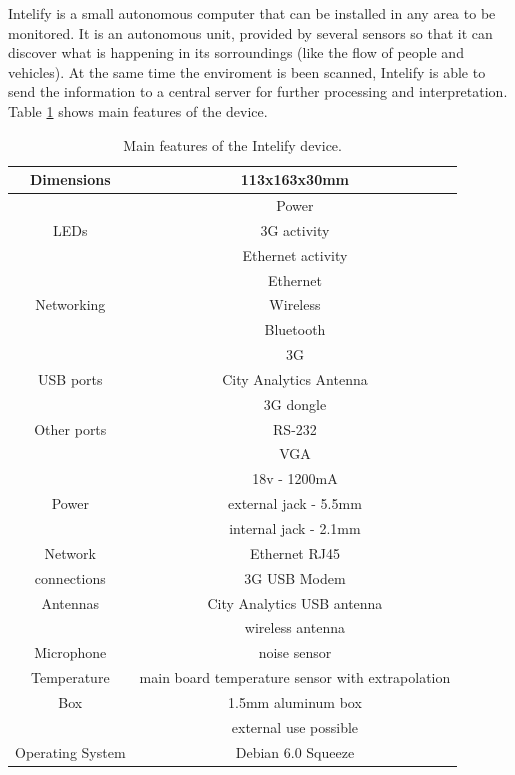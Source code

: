 \documentclass[preprint,authoryear,12pt]{elsarticle}
\begin{document}
Intelify is a small autonomous computer that can be installed in any area to be monitored. It is an autonomous unit, provided by several sensors so that it can discover what is happening in its sorroundings (like the flow of people and vehicles). At the same time the enviroment is been scanned, Intelify is able to send the information to a central server for further processing and interpretation. Table \ref{caracteristicas} shows main features of the device.

\begin{table}[htpb]
\begin{center}
\begin{tabular}{|c|c|}
\hline
Dimensions & 113x163x30mm \\
\hline
     & Power             \\
LEDs & 3G activity       \\
     & Ethernet activity \\
\hline
           & Ethernet  \\
Networking & Wireless  \\
           & Bluetooth \\  
           & 3G        \\
\hline
USB ports & City Analytics Antenna \\
		  & 3G dongle              \\
\hline
Other ports & RS-232 \\
			& VGA    \\
\hline
 	  & 18v - 1200mA          \\
Power & external jack - 5.5mm \\
      & internal jack - 2.1mm \\
\hline
Network     & Ethernet RJ45 \\
connections & 3G USB Modem  \\
\hline
Antennas & City Analytics USB antenna \\
		 & wireless antenna \\
\hline
Microphone & noise sensor \\
\hline
Temperature & main board temperature sensor with extrapolation \\
\hline
Box & 1.5mm aluminum box \\
    & external use possible  \\
\hline
Operating System & Debian 6.0 Squeeze  \\
\hline
\end{tabular}
\end{center}
\caption{Main features of the Intelify device.}
\label{caracteristicas}
\end{table}
\end{document}
